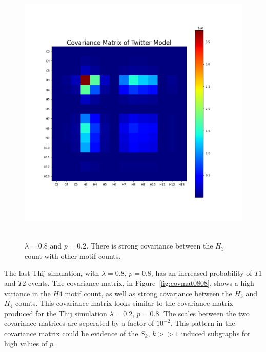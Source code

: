 
\begin{figure}
    \includegraphics[width=0.9\linewidth]{Images/CovMatTwitterModel080209.png}\
    \centering
    \caption{$\lambda=0.8$ and $p=0.2$. There is strong covariance between the $H_{3}$ count with 
    other motif counts.}
    \label{fig:covmat0802}
\end{figure}

The last Thij simulation, with $\lambda=0.8$, $p=0.8$, has an increased probability of $T1$ and $T2$ events.
The covariance matrix, in Figure~\ref{fig:covmat0808}, shows a high variance in the $H4$ motif count, as 
well as strong covariance between the $H_3$ and $H_4$ counts. This covariance matrix looks similar to the 
covariance matrix produced for the Thij simulation $\lambda=0.2$, $p=0.8$. The scales between the two covariance 
matrices are seperated by a factor of $10^{-2}$. This pattern in the covariance matrix could be evidence of the $S_k$, $k>>1$ induced subgraphs
for high values of $p$.

